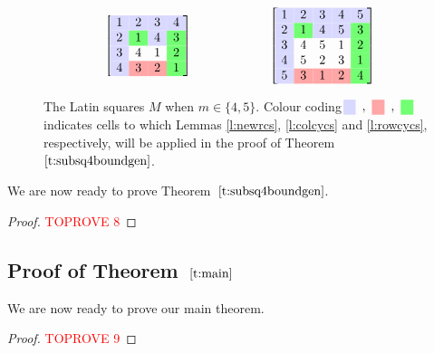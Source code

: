 \documentclass[12pt]{article}
\providecommand{\con}{\cellcolor{blue!15}}
\providecommand{\ctw}{\cellcolor{red!35}}
\providecommand{\cth}{\cellcolor{green!55}}
\theoremstyle{definition}
\numberwithin{equation}{section}
\def\tref#1{Theorem~$\ref{#1}$}
\begin{document}
	\begin{figure}
		\[
		\begin{minipage}{.4\textwidth}
			\begin{equation*}
				\left[\;
				\begin{matrix}
					\con1&\con2&\con3&\con4\\
					\con2&\cth1&\con4&\cth3\\
					\con3&4&1&\cth2\\
					\con4&\ctw3&\ctw2&\cth1
				\end{matrix}
				\;\right]
			\end{equation*}
		\end{minipage}
		\begin{minipage}{.4\textwidth}
			\begin{equation*}
				\left[\;
				\begin{matrix}
					\con1&\con2&\con3&\con4&\con5\\
					\con2&\cth1&\con4&\con5&\cth3\\
					\con3&4&5&1&\cth2\\
					\con4&5&2&3&\cth1\\
					\con5&\ctw3&\ctw1&\ctw2&\cth4
				\end{matrix}
				\;
				\right]
			\end{equation*}
		\end{minipage}
		\]
		\caption{\label{f:LS45}The Latin squares $M$ when
			$m\in\{4,5\}$. Colour coding
			$\;\begin{matrix}\con&,&\ctw&,&\cth\end{matrix}\;$ indicates cells
			to which Lemmas \ref{l:newrcs}, \ref{l:colcycs} and
			\ref{l:rowcycs}, respectively, will be applied in the proof of
			\tref{t:subsq4boundgen}.}
	\end{figure}
	
	We are now ready to prove \tref{t:subsq4boundgen}.
	
	\begin{proof}\textcolor{red}{TOPROVE 8}\end{proof}
	
	\subsection{Proof of \tref{t:main}}\label{ss:combine}
	
	We are now ready to prove our main theorem.
	
	\begin{proof}\textcolor{red}{TOPROVE 9}\end{proof}
	
\end{document}
